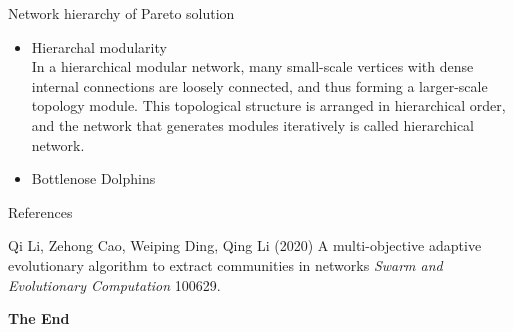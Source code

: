 \documentclass[aspectratio=169,xcolor=dvipsnames]{beamer}
\begin{document}

\begin{frame}{Network hierarchy of Pareto solution}
    \begin{itemize}
        \item Hierarchal modularity \\
        In a hierarchical modular network, many small-scale vertices with dense internal connections are loosely connected, and thus forming a larger-scale topology module. This topological structure is arranged in hierarchical order, and the network that generates modules iteratively is called hierarchical network.
        \item Bottlenose Dolphins
    \end{itemize}
\end{frame}


\begin{frame}{References}
    \footnotesize{
        \begin{thebibliography}{99}
             Qi Li, Zehong Cao, Weiping Ding, Qing Li (2020)
            \newblock A multi-objective adaptive evolutionary algorithm to extract communities in networks
            \newblock \emph{Swarm and Evolutionary Computation} 100629.
        \end{thebibliography}
    }
\end{frame}


\begin{frame}
    \Huge{\centerline{\textbf{The End}}}
\end{frame}

\end{document}
